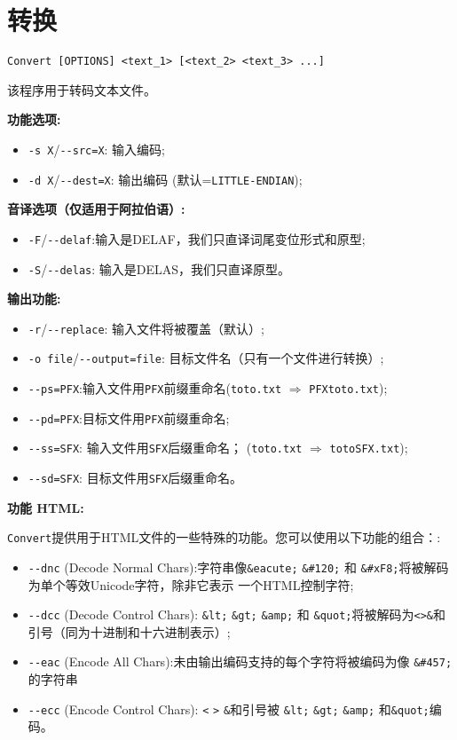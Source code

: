 \section{转换}
\verb+Convert [OPTIONS] <text_1> [<text_2> <text_3> ...]+

\bigskip
\noindent 该程序用于转码文本文件。

\bigskip
\noindent \textbf{功能选项:}
\begin{itemize}
\item \verb+-s X+/\verb+--src=X+: 输入编码;
\item \verb+-d X+/\verb+--dest=X+: 输出编码
	(默认=\verb$LITTLE-ENDIAN$);
\end{itemize}

\bigskip
\noindent \textbf{音译选项（仅适用于阿拉伯语）:}
\begin{itemize}
\item \verb+-F+/\verb+--delaf+:输入是DELAF，我们只直译词尾变位形式和原型;
\item \verb+-S+/\verb+--delas+: 输入是DELAS，我们只直译原型。
\end{itemize}


\bigskip
\noindent \textbf{输出功能:}
\begin{itemize}
\item \verb+-r+/\verb+--replace+: 输入文件将被覆盖（默认）;
\item \verb+-o file+/\verb+--output=file+: 目标文件名（只有一个文件进行转换）;
\item \verb+--ps=PFX+:输入文件用\verb+PFX+前缀重命名(\verb+toto.txt+ $\Rightarrow$ \verb+PFXtoto.txt+); 
\item \verb+--pd=PFX+:目标文件用\verb+PFX+前缀重命名;
\item \verb+--ss=SFX+: 输入文件用\verb+SFX+后缀重命名；
        (\verb+toto.txt+ $\Rightarrow$ \verb+totoSFX.txt+);
\item \verb+--sd=SFX+: 目标文件用\verb+SFX+后缀重命名。
\end{itemize}

\bigskip
\noindent \textbf{功能 HTML:}

\noindent \verb+Convert+提供用于HTML文件的一些特殊的功能。您可以使用以下功能的组合：:

\begin{itemize}
\item \verb+--dnc+ (Decode Normal Chars):字符串像\verb+&eacute;+
	\verb+&#120;+ 和 \verb+&#xF8;+将被解码为单个等效Unicode字符，除非它表示
一个HTML控制字符; 
  
  \item \verb+--dcc+ (Decode Control Chars): \verb+&lt;+ \verb+&gt;+
  	  \verb+&amp;+ 和 \verb+&quot;+将被解码为\verb+<+\verb+>+\verb+&+和引号（同为十进制和十六进制表示）;

  
  \item \verb+--eac+ (Encode All Chars):未由输出编码支持的每个字符将被编码为像 \verb+&#457;+的字符串 
  
  \item \verb+--ecc+ (Encode Control Chars): \verb+<+ \verb+>+
  	  \verb+&+和引号被 \verb+&lt;+ \verb+&gt;+ \verb+&amp;+ 和\verb+&quot;+编码。
\end{itemize} 

